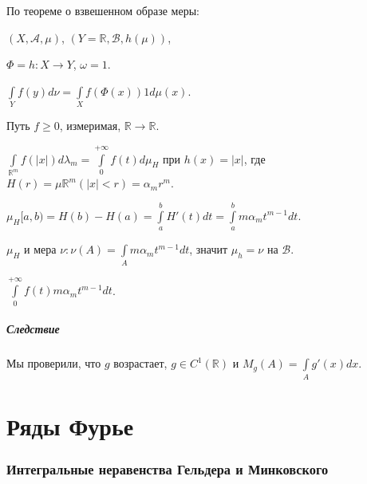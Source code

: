 \documentclass{article}
\begin{document}
            По теореме о взвешенном образе меры:
            
            $(X, \mathcal{A}, \mu)$, $(Y = \mathbb{R}, \mathcal{B}, h(\mu))$,
            
            $\Phi = h : X \rightarrow Y$, $\omega = 1$.
            
            $\int\limits_Y f(y) d \nu = \int\limits_X f(\Phi(x)) 1 d \mu(x)$.
            
        Путь $f \geqslant 0$, измеримая, $\mathbb{R} \rightarrow \mathbb{R}$.
    
        $\int\limits_{\mathbb{R}^m} f \left( | x | \right) d \lambda_m = \int\limits_0^{+\infty} f(t) d \mu_H$ при $h(x) = |x|$, где $H(r) = \mu \mathbb{R}^m \left( |x| < r \right) = \alpha_m r^m$.
    
        $\mu_H [a, b) = H(b) - H(a) = \int\limits^b_a H'(t) dt = \int\limits^b_a m \alpha_m t^{m - 1} dt$.
    
        $\mu_H$ и мера $\nu : \nu(A) = \int\limits_A m \alpha_m t^{m - 1} dt$, значит $\mu_h = \nu$ на $\mathcal{B}$. 
    
        $\int\limits^{+\infty}_0 f(t) m \alpha_m t^{m - 1} dt$.
    
            \subsubsection{Следствие}
        
                Мы проверили, что $g$ возрастает, $g \in C^1 \left( \mathbb{R} \right)$ и $M_g(A) = \int\limits_A g'(x) dx$.
            
\newpage

\part{Ряды Фурье}

\newpage

    \section{Интегральные неравенства Гельдера и Минковского}
    
\end{document}
